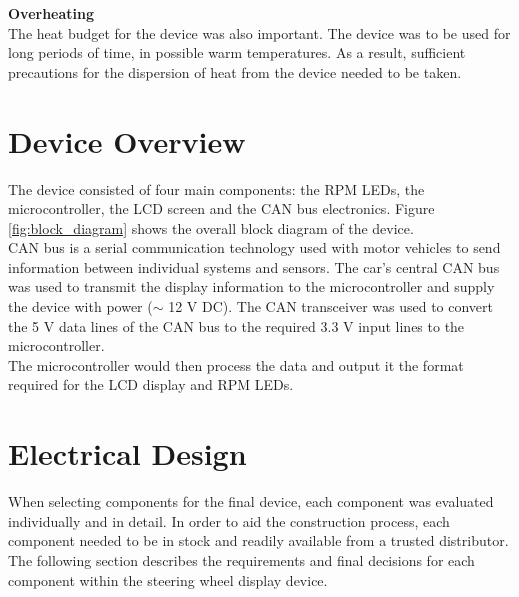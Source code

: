 \documentclass[a4paper,12pt]{article}
\begin{document}
\textbf{Overheating} \\

The heat budget for the device was also important. The device was to be used for long periods of time, in possible warm temperatures. As a result, sufficient precautions for the dispersion of heat from the device needed to be taken.


\newpage
\section{Device Overview}
\label{sec:device_overview}

The device consisted of four main components: the RPM LEDs, the microcontroller, the LCD screen and the CAN bus electronics. Figure \ref{fig:block_diagram} shows the overall block diagram of the device. \\



CAN bus is a serial communication technology used with motor vehicles to send information between individual systems and sensors. The car's central CAN bus was used to transmit the display information to the microcontroller and supply the device with power ($\sim$ 12 V DC). The CAN transceiver was used to convert the 5 V data lines of the CAN bus to the required 3.3 V input lines to the microcontroller. \\

The microcontroller would then process the data and output it the format required for the LCD display and RPM LEDs. \\


\newpage
\section{Electrical Design}
\label{sec:electrical_design}

When selecting components for the final device, each component was evaluated individually and in detail. In order to aid the construction process, each component needed to be in stock and readily available from a trusted distributor. The following section describes the requirements and final decisions for each component within the steering wheel display device. \\
\end{document}
